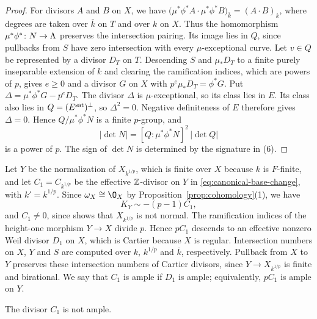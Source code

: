 \begin{proof}
For divisors $A$ and $B$ on $X$, we have $\bigl(\mu^*\phi^*A\cdot \mu^*\phi^*B\bigr)_{\bar k} = (A\cdot B)_k$, where degrees are taken over $\bar k$ on $T$ and over $k$ on $X$.
Thus the homomorphism $\mu^*\phi^*\colon N\to\Lambda$ preserves the intersection pairing.
Its image lies in $Q$, since pullbacks from $S$ have zero intersection with every $\mu$-exceptional curve.
Let $v\in Q$ be represented by a divisor $D_T$ on $T$.
Descending $S$ and $\mu_*D_T$ to a finite purely inseparable extension of $k$ and clearing the ramification indices, which are powers of $p$, gives $e\geq 0$ and a divisor $G$ on $X$ with $p^e\mu_*D_T = \phi^*G$.
Put $\Delta = \mu^*\phi^*G-p^eD_T$.
The divisor $\Delta$ is $\mu$-exceptional, so its class lies in $E$.
Its class also lies in $Q = (E^{\rm sat})^\perp$, so $\Delta^2 = 0$.
Negative definiteness of $E$ therefore gives $\Delta = 0$.
Hence $Q/\mu^*\phi^*N$ is a finite $p$-group, and
\[
  \lvert\det N\rvert = [Q:\mu^*\phi^*N]^2\,\lvert\det Q\rvert
\]
is a power of $p$.
The sign of $\det N$ is determined by the signature in \textup{(6)}.
\end{proof}

Let $Y$ be the normalization of $X_{k^{1/p}}$, which is finite over $X$ because $k$ is $F$-finite, and let $C_1 = C_{k^{1/p}}$ be the effective $\mathbb{Z}$-divisor on $Y$ in \eqref{eq:canonical-base-change}, with $k' = k^{1/p}$.
Since $\omega_X\cong\O_X$ by Proposition~\ref{prop:cohomology}(1), we have
\[
  K_Y\sim-(p-1)C_1,
\]
and $C_1\neq 0$, since \cite[Proposition~2.10(3)]{Tan21} shows that $X_{k^{1/p}}$ is not normal.
The ramification indices of the height-one morphism $Y\to X$ divide $p$.
Hence $pC_1$ descends to an effective nonzero Weil divisor $D_1$ on $X$, which is Cartier because $X$ is regular.
Intersection numbers on $X$, $Y$ and $S$ are computed over $k$, $k^{1/p}$ and $\bar k$, respectively.
Pullback from $X$ to $Y$ preserves these intersection numbers of Cartier divisors, since $Y\to X_{k^{1/p}}$ is finite and birational.
We say that $C_1$ is ample if $D_1$ is ample; equivalently, $pC_1$ is ample on $Y$.

\begin{proposition}\label{prop:ample-conductor}
The divisor $C_1$ is not ample.
\end{proposition}

